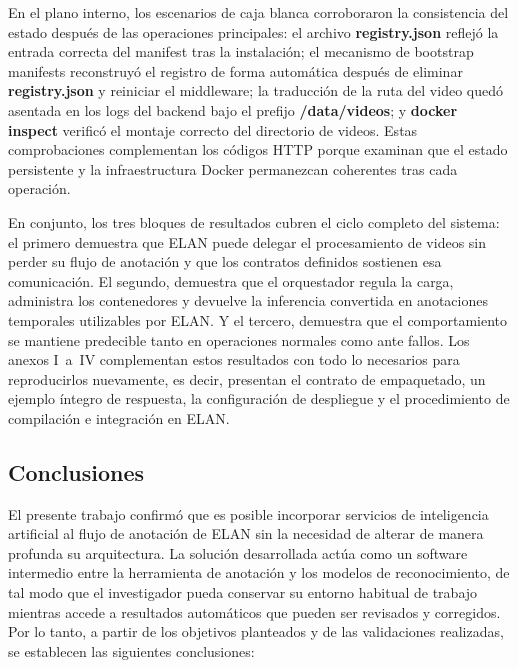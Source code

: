 \documentclass[11pt,a4paper]{article}
\begin{document}
En el plano interno, los escenarios de caja blanca corroboraron la consistencia del estado después de las operaciones principales: el archivo \textbf{registry.json} reflejó la entrada correcta del manifest tras la instalación; el mecanismo de bootstrap manifests reconstruyó el registro de forma automática después de eliminar \textbf{registry.json} y reiniciar el middleware; la traducción de la ruta del video quedó asentada en los logs del backend bajo el prefijo \textbf{/data/videos}; y \textbf{docker inspect} verificó el montaje correcto del directorio de videos. Estas comprobaciones complementan los códigos HTTP porque examinan que el estado persistente y la infraestructura Docker permanezcan coherentes tras cada operación.

En conjunto, los tres bloques de resultados cubren el ciclo completo del sistema: el primero demuestra que ELAN puede delegar el procesamiento de videos sin perder su flujo de anotación y que los contratos definidos sostienen esa comunicación. El segundo, demuestra que el orquestador regula la carga, administra los contenedores y devuelve la inferencia convertida en anotaciones temporales utilizables por ELAN. Y el tercero, demuestra que el comportamiento se mantiene predecible tanto en operaciones normales como ante fallos. Los anexos I~a~IV complementan estos resultados con todo lo necesarios para reproducirlos nuevamente, es decir, presentan el contrato de empaquetado, un ejemplo íntegro de respuesta, la configuración de despliegue y el procedimiento de compilación e integración en ELAN.

\vspace{1\baselineskip}


\subsection{Conclusiones}

El presente trabajo confirmó que es posible incorporar servicios de inteligencia artificial al flujo de anotación de ELAN sin la necesidad de alterar de manera profunda su arquitectura. La solución desarrollada actúa como un software intermedio entre la herramienta de anotación y los modelos de reconocimiento, de tal modo que el investigador pueda conservar su entorno habitual de trabajo mientras accede a resultados automáticos que pueden ser revisados y corregidos. Por lo tanto, a partir de los objetivos planteados y de las validaciones realizadas, se establecen las siguientes conclusiones:
\end{document}
